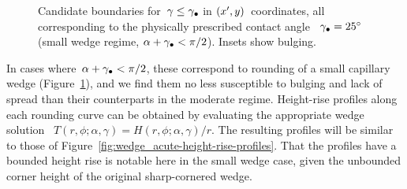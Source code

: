 \begin{figure}
  \newcommand*{\subfigurewidth}{0.31\textwidth}
  \begin{subfigure}[t]{\subfigurewidth}
  \end{subfigure}
  \hfill
  \begin{subfigure}[t]{\subfigurewidth}
  \end{subfigure}
  \hfill
  \begin{subfigure}[t]{\subfigurewidth}
  \end{subfigure}
  \caption{
    Candidate boundaries for~$\gamma \le \gamma_\bullet$
    in $(x', y)$~coordinates,
    all corresponding to the physically prescribed contact angle~%
    $\gamma_\bullet = \SI{25}{\degree}$
    (small wedge regime, $\alpha + \gamma_\bullet < \pi/2$).
    Insets show bulging.
  }
  \label{fig:wedge_small-small-candidates-offset}
\end{figure}

In cases where~$\alpha + \gamma_\bullet < \pi/2$,
these correspond to rounding of a small capillary wedge
(Figure~\ref{fig:wedge_small-small-candidates-offset}),
and we find them no less susceptible to bulging and lack of spread
than their counterparts in the moderate regime.
Height-rise profiles along each rounding curve can be obtained
by evaluating the appropriate wedge solution~%
  $T (r, \phi; \alpha, \gamma) = H (r, \phi; \alpha, \gamma) / r$.
The resulting profiles will be similar to those
of Figure~\ref{fig:wedge_acute-height-rise-profiles}.
That the profiles have a bounded height rise
is notable here in the small wedge case,
given the unbounded corner height
of the original sharp-cornered wedge.

